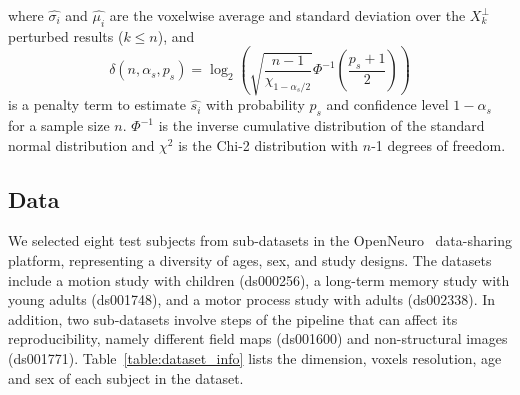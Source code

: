 \documentclass[lettersize,journal]{IEEEtran}
\begin{document}
{where $\hat{\sigma_i}$ and $\hat{\mu_i}$ are the voxelwise average and standard deviation over the $X_k^\perp$ perturbed results ($k \leq n$), and
\begin{equation}
  \delta(n, \alpha_s, p_s) = \log_2 \left( \sqrt{\frac{n-1}{\chi_{1-\alpha_s/2}}} \Phi^{-1} \left( \frac{p_s+1}{2} \right) \right)
\end{equation}
is a penalty term to estimate $\hat{s_i}$ with probability $p_s$ and confidence level $1-\alpha_s$ for a sample size $n$.
$\Phi^{-1}$ is the inverse cumulative distribution of the standard normal distribution and $\chi^2$ is the Chi-2 distribution with $n$-1 degrees of freedom.


\subsection{Data}
\label{subsec:data}

We selected eight test subjects from sub-datasets in the OpenNeuro~\cite{markiewicz2021openneuro} data-sharing platform, representing a diversity of ages, sex, and study designs. The datasets include a motion study with children (ds000256), a long-term memory study with young adults (ds001748), and a motor process study with adults (ds002338). In addition, two sub-datasets involve steps of the pipeline that can affect its reproducibility, namely different field maps (ds001600) and non-structural images (ds001771). Table~\ref{table:dataset_info} lists the dimension, voxels resolution, age and sex of each subject in the dataset.

}
\end{document}
